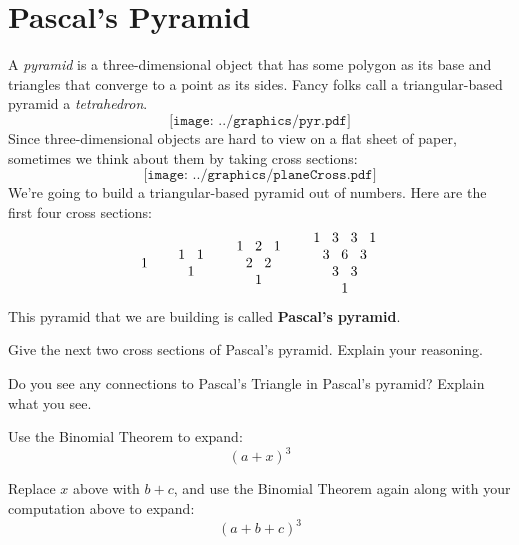 \newpage
\section{Pascal's Pyramid}\label{A:pyramid}

A \textit{pyramid} is a three-dimensional object that has some polygon
as its base and triangles that converge to a point as its sides. Fancy
folks call a triangular-based pyramid a
\textit{tetrahedron}.
\[
\texttt{[image: ../graphics/pyr.pdf]}
\]
Since three-dimensional objects are hard to view on a flat sheet of
paper, sometimes we think about them by taking cross sections:
\[
\texttt{[image: ../graphics/planeCross.pdf]}
\]
We're going to build a triangular-based pyramid out of numbers. Here
are the first four cross sections:
\[
1 \qquad 
\begin{tabular}{@{\,}c@{\,}c@{\,}c@{\,}}
1 & & 1\\
 & 1 & 
\end{tabular}
\qquad 
\begin{tabular}{@{\,}c@{\,}c@{\,}c@{\,}c@{\,}c@{\,}}
1 & & 2 & & 1 \\
 & 2 & & 2 &  \\
 & & 1 & &  
\end{tabular}
\qquad
\begin{tabular}{@{\,}c@{\,}c@{\,}c@{\,}c@{\,}c@{\,}c@{\,}c@{\,}}
1 & & 3 & & 3 & & 1 \\
 & 3 & & 6 & & 3 &  \\ 
 & & 3 & & 3 & &  \\ 
 & & & 1 & & &  
\end{tabular}
\]
This pyramid that we are building is called \textbf{Pascal's
  pyramid}.

\begin{prob} 
Give the next two cross sections of Pascal's pyramid. Explain your
reasoning.
\end{prob}


\begin{prob} 
Do you see any connections to Pascal's Triangle in Pascal's pyramid?
Explain what you see.
\end{prob}


\begin{prob} Use the Binomial Theorem to expand:
\[
(a + x)^3
\]
\end{prob}



\begin{prob} 
Replace $x$ above with $b+c$, and use the Binomial Theorem again along
with your computation above to expand:
\[
(a + b + c)^3
\]
\end{prob}


